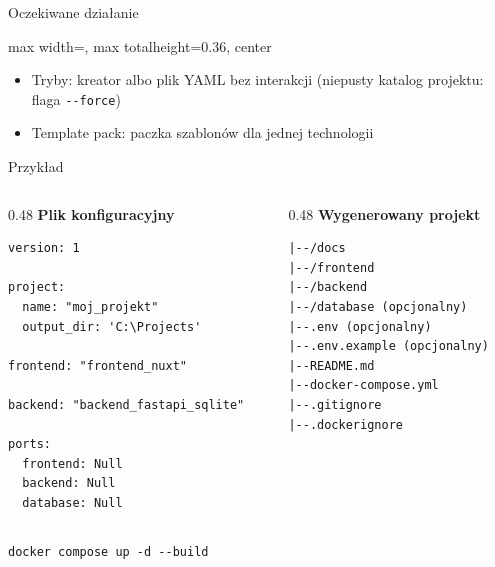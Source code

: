 \documentclass[aspectratio=169, 11pt]{beamer}
\begin{document}
\begin{frame}{Oczekiwane działanie}
  \begin{adjustbox}{max width=\textwidth, max totalheight=0.36\textheight, center}
  \end{adjustbox}

  \vspace{2mm}
  {\small
  \begin{itemize}
    \item Tryby: kreator albo plik YAML bez interakcji (niepusty katalog projektu: flaga \texttt{-{}-force})
    \item Template pack: paczka szablonów dla jednej technologii
  \end{itemize}
  }
\end{frame}

\begin{frame}[fragile]{Przykład}
  \begin{columns}[T]
    \begin{column}{0.48\textwidth}
      \textbf{Plik konfiguracyjny}
\begin{lstlisting}[style=code]
version: 1

project:
  name: "moj_projekt"
  output_dir: 'C:\Projects'

frontend: "frontend_nuxt"

backend: "backend_fastapi_sqlite"

ports:
  frontend: Null
  backend: Null
  database: Null
\end{lstlisting}
    \end{column}
    \begin{column}{0.48\textwidth}
      \textbf{Wygenerowany projekt}
\begin{lstlisting}[style=code]
|--/docs
|--/frontend
|--/backend
|--/database (opcjonalny)
|--.env (opcjonalny)
|--.env.example (opcjonalny)
|--README.md
|--docker-compose.yml
|--.gitignore
|--.dockerignore
\end{lstlisting}
    \end{column}
  \end{columns}

  \begin{center}
    \texttt{docker compose up -d -{}-build}
  \end{center}
\end{frame}
\end{document}
